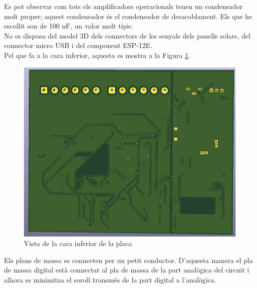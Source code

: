\noindent Es pot observar com tots els amplificadors operacionals tenen un condensador molt proper; aquest condensador és el condensador de desacoblament. Els que he escollit son de 100 nF, un valor molt típic.\\
\newline No es disposa del model 3D dels connectors de les senyals dels panells solars, del connector micro USB i del component ESP-12E.\\
\newline Pel que fa a la cara inferior, aquesta es mostra a la Figura \ref{fig:inf}.

\begin{figure}[H]
\begin{center}
\includegraphics[scale=0.30]{images/3d_2.png}
\end{center}
\caption{Vista de la cara inferior de la placa}
\label{fig:inf}
\end{figure}
\noindent Els plans de massa es connecten per un petit conductor. D'aquesta manera el pla de massa digital està connectat al pla de massa de la part analògica del circuit i alhora es minimitza el soroll transmès de la part digital a l'analògica.


\clearpage


